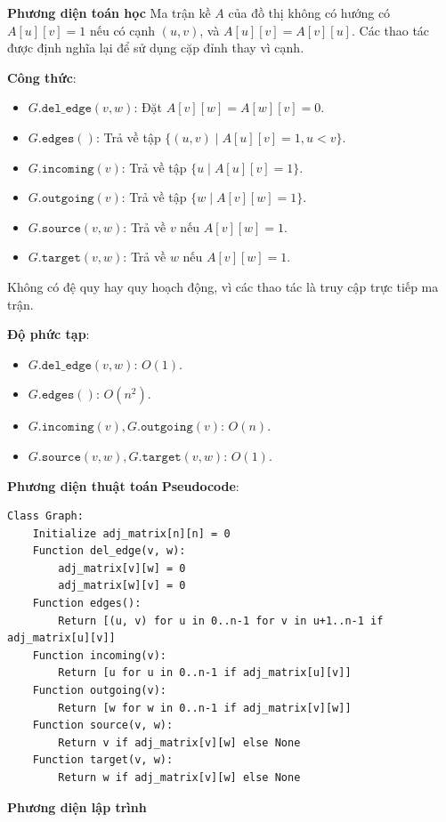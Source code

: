 \documentclass[a4paper,12pt]{article}
\begin{document}
\textbf{Phương diện toán học}
Ma trận kề \( A \) của đồ thị không có hướng có \( A[u][v] = 1 \) nếu có cạnh \( (u,v) \), và \( A[u][v] = A[v][u] \). Các thao tác được định nghĩa lại để sử dụng cặp đỉnh thay vì cạnh.

\textbf{Công thức}:
\begin{itemize}
    \item \( G.\texttt{del\_edge}(v, w) \): Đặt \( A[v][w] = A[w][v] = 0 \).
    \item \( G.\texttt{edges}() \): Trả về tập \( \{(u,v) \mid A[u][v] = 1, u < v\} \).
    \item \( G.\texttt{incoming}(v) \): Trả về tập \( \{u \mid A[u][v] = 1\} \).
    \item \( G.\texttt{outgoing}(v) \): Trả về tập \( \{w \mid A[v][w] = 1\} \).
    \item \( G.\texttt{source}(v, w) \): Trả về \( v \) nếu \( A[v][w] = 1 \).
    \item \( G.\texttt{target}(v, w) \): Trả về \( w \) nếu \( A[v][w] = 1 \).
\end{itemize}
Không có đệ quy hay quy hoạch động, vì các thao tác là truy cập trực tiếp ma trận.

\textbf{Độ phức tạp}:
\begin{itemize}
    \item \( G.\texttt{del\_edge}(v, w) \): \( O(1) \).
    \item \( G.\texttt{edges}() \): \( O(n^2) \).
    \item \( G.\texttt{incoming}(v), G.\texttt{outgoing}(v) \): \( O(n) \).
    \item \( G.\texttt{source}(v, w), G.\texttt{target}(v, w) \): \( O(1) \).
\end{itemize}

\textbf{Phương diện thuật toán}
\textbf{Pseudocode}:
\begin{verbatim}
Class Graph:
    Initialize adj_matrix[n][n] = 0
    Function del_edge(v, w):
        adj_matrix[v][w] = 0
        adj_matrix[w][v] = 0
    Function edges():
        Return [(u, v) for u in 0..n-1 for v in u+1..n-1 if adj_matrix[u][v]]
    Function incoming(v):
        Return [u for u in 0..n-1 if adj_matrix[u][v]]
    Function outgoing(v):
        Return [w for w in 0..n-1 if adj_matrix[v][w]]
    Function source(v, w):
        Return v if adj_matrix[v][w] else None
    Function target(v, w):
        Return w if adj_matrix[v][w] else None
\end{verbatim}

\textbf{Phương diện lập trình}
\end{document}

